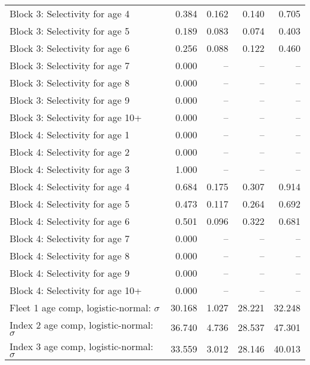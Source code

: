 \documentclass[
]{article}
\begin{document}
\begin{landscape}
\begin{longtable}[t]{lrrrr}
Block 3: Selectivity for age 4 & 0.384 & 0.162 & 0.140 & 0.705\\
Block 3: Selectivity for age 5 & 0.189 & 0.083 & 0.074 & 0.403\\
Block 3: Selectivity for age 6 & 0.256 & 0.088 & 0.122 & 0.460\\
Block 3: Selectivity for age 7 & 0.000 & -- & -- & --\\
\addlinespace
Block 3: Selectivity for age 8 & 0.000 & -- & -- & --\\
Block 3: Selectivity for age 9 & 0.000 & -- & -- & --\\
Block 3: Selectivity for age 10+ & 0.000 & -- & -- & --\\
Block 4: Selectivity for age 1 & 0.000 & -- & -- & --\\
Block 4: Selectivity for age 2 & 0.000 & -- & -- & --\\
\addlinespace
Block 4: Selectivity for age 3 & 1.000 & -- & -- & --\\
Block 4: Selectivity for age 4 & 0.684 & 0.175 & 0.307 & 0.914\\
Block 4: Selectivity for age 5 & 0.473 & 0.117 & 0.264 & 0.692\\
Block 4: Selectivity for age 6 & 0.501 & 0.096 & 0.322 & 0.681\\
Block 4: Selectivity for age 7 & 0.000 & -- & -- & --\\
\addlinespace
Block 4: Selectivity for age 8 & 0.000 & -- & -- & --\\
Block 4: Selectivity for age 9 & 0.000 & -- & -- & --\\
Block 4: Selectivity for age 10+ & 0.000 & -- & -- & --\\
Fleet 1 age comp, logistic-normal: $\sigma$ & 30.168 & 1.027 & 28.221 & 32.248\\
Index 2 age comp, logistic-normal: $\sigma$ & 36.740 & 4.736 & 28.537 & 47.301\\
\addlinespace
Index 3 age comp, logistic-normal: $\sigma$ & 33.559 & 3.012 & 28.146 & 40.013\\*
\end{longtable}
\end{landscape}
\end{document}
